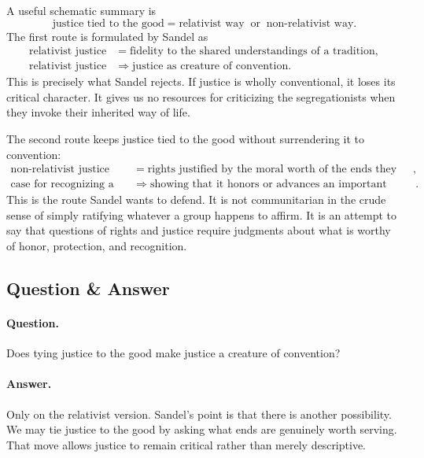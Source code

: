 A useful schematic summary is
\begin{equation}
\text{justice tied to the good}
=
\text{relativist way}
\;\;\text{or}\;\;
\text{non-relativist way}.
\end{equation}
The first route is formulated by Sandel as
\begin{align}
\text{relativist justice}
&=
\text{fidelity to the shared understandings of a tradition},\\
\text{relativist justice}
&\Longrightarrow
\text{justice as creature of convention}.
\end{align}
This is precisely what Sandel rejects. If justice is wholly conventional, it loses its critical character. It gives us no resources for criticizing the segregationists when they invoke their inherited way of life.

The second route keeps justice tied to the good without surrendering it to convention:
\begin{align}
\text{non-relativist justice}
&=
\text{rights justified by the moral worth of the ends they serve},\\
\text{case for recognizing a right}
&\Longrightarrow
\text{showing that it honors or advances an important human good}.
\end{align}
This is the route Sandel wants to defend. It is not communitarian in the crude sense of simply ratifying whatever a group happens to affirm. It is an attempt to say that questions of rights and justice require judgments about what is worthy of honor, protection, and recognition.

\subsection{Question \& Answer}

\paragraph{Question.} Does tying justice to the good make justice a creature of convention?

\paragraph{Answer.} Only on the relativist version. Sandel's point is that there is another possibility. We may tie justice to the good by asking what ends are genuinely worth serving. That move allows justice to remain critical rather than merely descriptive.

